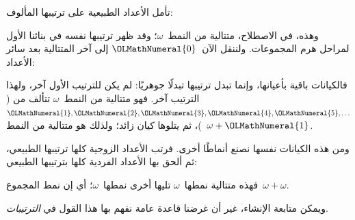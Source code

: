 \documentclass[../../../include/open-logic-section]{subfiles}
\begin{document}

تأمل الأعداد الطبيعية على ترتيبها المألوف:
\begin{center}
\end{center}
وهذه، في الاصطلاح، متتالية من النمط~$\omega$؛ وقد ظهر ترتيبها نفسه في
بنائنا الأول لمراحل هرم المجموعات. ولننقل الآن~${\OLMathNumeral{0}}$ إلى آخر المتتالية
بعد سائر الأعداد:
\begin{center}
\end{center}
فالكيانات باقية بأعيانها، وإنما تبدل ترتيبها تبدلًا جوهريًا: لم يكن
للترتيب الأول آخر، ولهذا الترتيب آخر. فهو متتالية من النمط~$\omega$
تتألف من (${\OLMathNumeral{1}}, {\OLMathNumeral{2}}, {\OLMathNumeral{3}}, {\OLMathNumeral{4}}, {\OLMathNumeral{5}}, \ldots$)، ثم يتلوها كيان زائد؛ ولذلك هو
متتالية من النمط~$\omega+{\OLMathNumeral{1}}$.

ومن هذه الكيانات نفسها نصنع أنماطًا أخرى. فرتب الأعداد الزوجية كلها
ترتيبها الطبيعي، ثم ألحق بها الأعداد الفردية كلها بترتيبها الطبيعي:
\begin{center}
\end{center}
فهذه متتالية نمطها~$\omega$ تليها أخرى نمطها~$\omega$؛ أي إن نمط
المجموع~$\omega+\omega$.

ويمكن متابعة الإنشاء، غير أن غرضنا قاعدة عامة نفهم بها هذا القول في
\emph{الترتيبات}.
\end{document}
